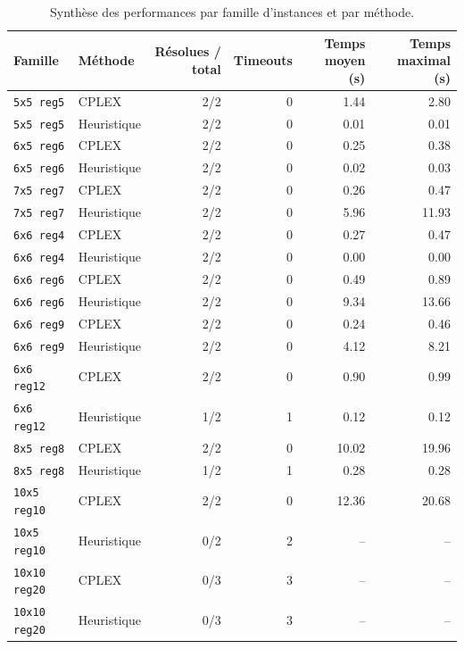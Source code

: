 \begingroup
\small
\setlength{\tabcolsep}{4pt}
\begin{table}[H]
\centering
\caption{Synthèse des performances par famille d'instances et par méthode.}
\label{tab:palisade-performance}
\begin{tabular}{llrrrr}
\toprule
Famille & Méthode & Résolues / total & Timeouts & Temps moyen (s) & Temps maximal (s)\\
\midrule
\texttt{5x5 reg5} & CPLEX & 2/2 & 0 & 1.44 & 2.80\\
\texttt{5x5 reg5} & Heuristique & 2/2 & 0 & 0.01 & 0.01\\
\midrule
\texttt{6x5 reg6} & CPLEX & 2/2 & 0 & 0.25 & 0.38\\
\texttt{6x5 reg6} & Heuristique & 2/2 & 0 & 0.02 & 0.03\\
\midrule
\texttt{7x5 reg7} & CPLEX & 2/2 & 0 & 0.26 & 0.47\\
\texttt{7x5 reg7} & Heuristique & 2/2 & 0 & 5.96 & 11.93\\
\midrule
\texttt{6x6 reg4} & CPLEX & 2/2 & 0 & 0.27 & 0.47\\
\texttt{6x6 reg4} & Heuristique & 2/2 & 0 & 0.00 & 0.00\\
\midrule
\texttt{6x6 reg6} & CPLEX & 2/2 & 0 & 0.49 & 0.89\\
\texttt{6x6 reg6} & Heuristique & 2/2 & 0 & 9.34 & 13.66\\
\midrule
\texttt{6x6 reg9} & CPLEX & 2/2 & 0 & 0.24 & 0.46\\
\texttt{6x6 reg9} & Heuristique & 2/2 & 0 & 4.12 & 8.21\\
\midrule
\texttt{6x6 reg12} & CPLEX & 2/2 & 0 & 0.90 & 0.99\\
\texttt{6x6 reg12} & Heuristique & 1/2 & 1 & 0.12 & 0.12\\
\midrule
\texttt{8x5 reg8} & CPLEX & 2/2 & 0 & 10.02 & 19.96\\
\texttt{8x5 reg8} & Heuristique & 1/2 & 1 & 0.28 & 0.28\\
\midrule
\texttt{10x5 reg10} & CPLEX & 2/2 & 0 & 12.36 & 20.68\\
\texttt{10x5 reg10} & Heuristique & 0/2 & 2 & -- & --\\
\midrule
\texttt{10x10 reg20} & CPLEX & 0/3 & 3 & -- & --\\
\texttt{10x10 reg20} & Heuristique & 0/3 & 3 & -- & --\\
\midrule
\bottomrule
\end{tabular}
\end{table}
\endgroup

